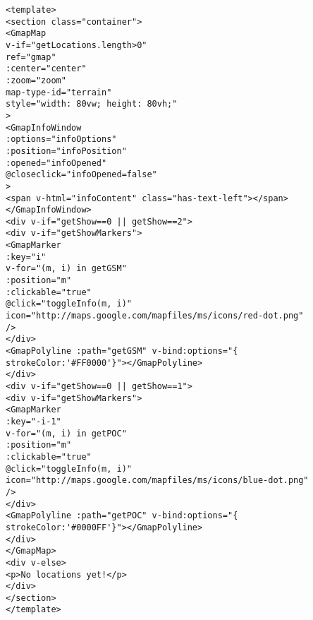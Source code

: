 \begin{verbatim}
<template>
<section class="container">
<GmapMap
v-if="getLocations.length>0"
ref="gmap"
:center="center"
:zoom="zoom"
map-type-id="terrain"
style="width: 80vw; height: 80vh;"
>
<GmapInfoWindow
:options="infoOptions"
:position="infoPosition"
:opened="infoOpened"
@closeclick="infoOpened=false"
>
<span v-html="infoContent" class="has-text-left"></span>
</GmapInfoWindow>
<div v-if="getShow==0 || getShow==2">
<div v-if="getShowMarkers">
<GmapMarker
:key="i"
v-for="(m, i) in getGSM"
:position="m"
:clickable="true"
@click="toggleInfo(m, i)"
icon="http://maps.google.com/mapfiles/ms/icons/red-dot.png"
/>
</div>
<GmapPolyline :path="getGSM" v-bind:options="{ strokeColor:'#FF0000'}"></GmapPolyline>
</div>
<div v-if="getShow==0 || getShow==1">
<div v-if="getShowMarkers">
<GmapMarker
:key="-i-1"
v-for="(m, i) in getPOC"
:position="m"
:clickable="true"
@click="toggleInfo(m, i)"
icon="http://maps.google.com/mapfiles/ms/icons/blue-dot.png"
/>
</div>
<GmapPolyline :path="getPOC" v-bind:options="{ strokeColor:'#0000FF'}"></GmapPolyline>
</div>
</GmapMap>
<div v-else>
<p>No locations yet!</p>
</div>
</section>
</template>


\end{verbatim}
